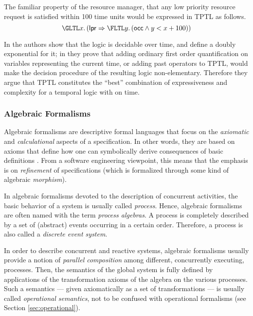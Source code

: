The familiar property of the resource manager, that any low priority 
resource request is satisfied within 100 time units would be 
expressed in TPTL as follows. 
\begin{equation*}
  \GLTL x. \left( \mathsf{lpr} \Rightarrow \FLTL y. \left( \mathsf{occ} \wedge y < x + 100 \right) \right)
\end{equation*}

In \cite{AH94} the authors show that the logic is decidable over  
time, and define a doubly exponential  for 
it; in \cite{AH92} they prove that adding ordinary first order quantification 
on variables representing the current time, or adding past operators 
to TPTL, would make the decision procedure of the resulting logic 
non-elementary. Therefore they argue that TPTL constitutes the 
``best'' combination of expressiveness and complexity for a temporal 
logic with  on time.



\subsubsection{Algebraic Formalisms} \label{sec:algebraic}
Algebraic formalisms are descriptive formal languages that focus 
on the \emph{axiomatic} and \emph{calculational} aspects of a specification. 
In other words, they are based on axioms that define how one 
can symbolically derive consequences of basic definitions \cite{Bae04,Bae03}. 
From a software engineering viewpoint, this means that the emphasis 
is on \emph{refinement} of specifications (which is formalized through 
some kind of algebraic \emph{morphism}).

In algebraic formalisms devoted to the description of concurrent 
activities, the basic behavior of a system is usually called \emph{process}. 
Hence, algebraic formalisms are often named with the term \emph{process 
algebras}. A process is completely described by a set of (abstract) 
events occurring in a certain order. Therefore, a process is 
also called a \emph{discrete event system}.

In order to describe concurrent and reactive systems, algebraic 
formalisms usually provide a notion of \emph{parallel composition} 
among different, concurrently executing, processes. Then, the 
semantics of the global system is fully defined by applications 
of the transformation axioms of the algebra on the various processes. 
Such a semantics --- given axiomatically as a set of transformations 
--- is usually called \emph{operational semantics}, not to be confused 
with operational formalisms (see Section \ref{sec:operational}).


